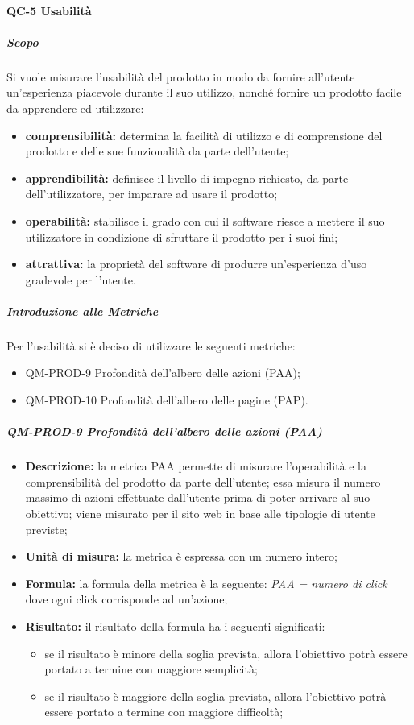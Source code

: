 		\paragraph{QC-5 Usabilità}
			\subparagraph{Scopo}
			Si vuole misurare l'usabilità del prodotto in modo da fornire all'utente un'esperienza piacevole durante il suo utilizzo, nonché fornire un prodotto facile da apprendere ed utilizzare:
			\begin{itemize}
				\item \textbf{comprensibilità:} determina la facilità di utilizzo e di comprensione del prodotto e delle sue funzionalità da parte dell'utente;
				\item \textbf{apprendibilità:} definisce il livello di impegno richiesto, da parte dell'utilizzatore, per imparare ad usare il prodotto;
				\item \textbf{operabilità:} stabilisce il grado con cui il software riesce a mettere il suo utilizzatore in condizione di sfruttare il prodotto per i suoi fini;
				\item \textbf{attrattiva:} la proprietà del software di produrre un'esperienza d'uso gradevole per l'utente.
			\end{itemize}
			\subparagraph{Introduzione alle Metriche}
				Per l'usabilità si è deciso di utilizzare le seguenti metriche:
				\begin{itemize}
					\item QM-PROD-9 Profondità dell'albero delle azioni (PAA);
					\item QM-PROD-10 Profondità dell'albero delle pagine (PAP).
				\end{itemize}
			\subparagraph{QM-PROD-9 Profondità dell'albero delle azioni (PAA)}
			\begin{itemize}
      			\item \textbf{Descrizione: }
					la metrica PAA permette di misurare l'operabilità e la comprensibilità del prodotto da parte dell'utente; essa misura il numero massimo di azioni effettuate dall'utente prima di poter arrivare al suo obiettivo; viene misurato per il sito web in base alle tipologie di utente previste;
				\item \textbf{Unità di misura: }
					la metrica è espressa con un numero intero;
				\item \textbf{Formula: }
					la formula della metrica è la seguente:
					\textit{PAA = numero di click}
					dove ogni click corrisponde ad un'azione;
				\item \textbf{Risultato: }
					il risultato della formula ha i seguenti significati:
					\begin{itemize}
						\item se il risultato è minore della soglia prevista, allora l'obiettivo potrà essere portato a termine con maggiore semplicità;
						\item se il risultato è maggiore della soglia prevista, allora l'obiettivo potrà essere portato a termine con maggiore difficoltà;
					\end{itemize}
			\end{itemize}
